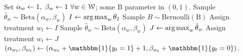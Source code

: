 \documentclass[xcolor={table}]{beamer}
\begin{document}
\algrenewcommand{}
\begin{frame}[label = ttts]

\begin{framed}
\begin{minipage}{\textwidth}
\tiny
\vspace{-2.5 em}
\begin{algorithm}[H]
\fontsize{5}{6}\selectfont
    \caption{Bernoulli top-two Thompson sampling}
    \label{algg:ttts}
    \begin{algorithmic}[1] %
    	\State Set  $\alpha_{w} \leftarrow 1, \ \beta_{w} \leftarrow 1\ \forall w \in {\EuScript W}$; some $\textrm{B}$ parameter in $(0,1)$. %
		     \State Sample $\hat \theta_w  \sim \textrm{Beta}\left(\alpha_{w}, \beta_{w} \right)$ 
			 \EndFor
		\State $I \leftarrow \operatorname*{\textrm{arg}\,\textrm{max}}_w \theta_2 $
		\State Sample $B\sim \textrm{Bernoulli}(\textrm{B})$
			\State Assign treatment $w_t \leftarrow I$
		\Else
			\Repeat
					\State Sample $\hat \theta_w  \sim \textrm{Beta}\left(\alpha_{w}, \beta_{w} \right)$ 
					\State $J \leftarrow \operatorname*{\textrm{arg}\,\textrm{max}}_w \hat\theta_w$
			 	\EndFor
			\State Assign treatment $w_t \leftarrow J$
		\EndIf
			\State $(\alpha_{w_t}, \beta_{w_t}) \leftarrow (\alpha_{w_t} + \mathbbm{1}\{ y_t = 1\} + 1,  \beta_{w_t} + \mathbbm{1}\{ y_t = 0\})$.  
	\EndFor
    \end{algorithmic}
\end{algorithm}
 \end{minipage}
 \vspace{-0.8 em}
\end{framed}
 \vspace{-0.5 em}

  \hyperlink{ttts-explainer}{}
\end{frame}
\end{document}
